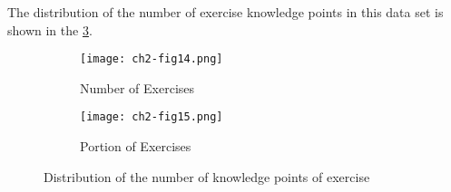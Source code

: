 The distribution of the number of exercise knowledge points in this data set is shown in the \figurename{\ref{ch2-fig14}}.
\begin{figure}[htbp!]
	\centering
	\begin{subfigure}[b]{0.475\textwidth}
		\texttt{[image: ch2-fig14.png]}
		\caption[dis]{Number of Exercises}\label{fig:ch2-fig14-hist}
	\end{subfigure}
	\begin{subfigure}[b]{0.475\textwidth}
		\texttt{[image: ch2-fig15.png]}
		\caption{Portion of Exercises}\label{fig:ch2-fig14-pie}
	\end{subfigure}
	\caption{Distribution of the number of knowledge points of exercise}\label{ch2-fig14}
\end{figure}





